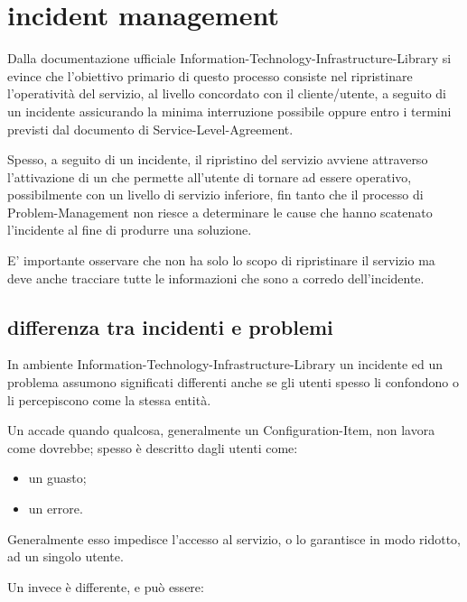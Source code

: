 %
%
\section[Incident Management]{incident management}
\label{prc-incident}
Dalla documentazione ufficiale \ac{Information-Technology-Infrastructure-Library} si evince che l'obiettivo primario di questo processo consiste nel ripristinare l'operatività del servizio, al livello concordato con il cliente/utente, a seguito di un incidente assicurando la minima interruzione possibile oppure entro i termini previsti dal documento di \ac{Service-Level-Agreement}.

Spesso, a seguito di un incidente, il ripristino del servizio avviene attraverso l'attivazione di un  che permette all'utente di tornare ad essere operativo, possibilmente con un livello di servizio inferiore, fin tanto che il processo di \ac{Problem-Management} non riesce a determinare le cause che hanno scatenato l'incidente al fine di produrre una soluzione.

E' importante osservare che non ha solo lo scopo di ripristinare il servizio ma deve anche tracciare tutte le informazioni che sono a corredo dell'incidente.


\subsection[Differenza tra incidenti e problemi]{differenza tra incidenti e problemi}
\label{prc-incident-versus-problem}
In ambiente \ac{Information-Technology-Infrastructure-Library} un incidente ed un problema assumono significati differenti anche se gli utenti spesso li confondono o li percepiscono come la stessa entità.

Un  accade quando qualcosa, generalmente un \ac{Configuration-Item}, non lavora come dovrebbe; spesso è descritto dagli utenti come:

\begin{itemize}
\item{un guasto;}
\item{un errore.}
\end{itemize}

Generalmente esso impedisce l'accesso al servizio, o lo garantisce in modo ridotto, ad un singolo utente.

Un  invece è differente, e può essere:

